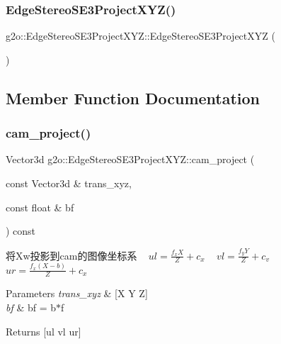 \subsubsection{\texorpdfstring{Edge\+Stereo\+S\+E3\+Project\+X\+Y\+Z()}{EdgeStereoSE3ProjectXYZ()}}
{\footnotesize\ttfamily g2o\+::\+Edge\+Stereo\+S\+E3\+Project\+X\+Y\+Z\+::\+Edge\+Stereo\+S\+E3\+Project\+X\+YZ (\begin{DoxyParamCaption}{ }\end{DoxyParamCaption})}



\subsection{Member Function Documentation}
\mbox{\label{classg2o_1_1_edge_stereo_s_e3_project_x_y_z_a5e1d2a6a247a6f9a95ccb7a59e3c543e}} 
\subsubsection{\texorpdfstring{cam\+\_\+project()}{cam\_project()}}
{\footnotesize\ttfamily Vector3d g2o\+::\+Edge\+Stereo\+S\+E3\+Project\+X\+Y\+Z\+::cam\+\_\+project (\begin{DoxyParamCaption}\item[{const Vector3d \&}]{trans\+\_\+xyz,  }\item[{const float \&}]{bf }\end{DoxyParamCaption}) const}

将\+Xw投影到cam的图像坐标系 ~\newline
 $ ul = \frac{f_x X}{Z} + c_x $ ~\newline
 $ vl = \frac{f_y Y}{Z} + c_v $ ~\newline
 $ ur = \frac{f_x (X-b)}{Z} + c_x $ ~\newline

\begin{DoxyParams}{Parameters}
{\em trans\+\_\+xyz} & \mbox{[}X Y Z\mbox{]} \\
\hline
{\em bf} & bf = b$\ast$f \\
\hline
\end{DoxyParams}
\begin{DoxyReturn}{Returns}
\mbox{[}ul vl ur\mbox{]} 
\end{DoxyReturn}
\mbox{\label{classg2o_1_1_edge_stereo_s_e3_project_x_y_z_ab60521439da10eabb13f23fe21fbe651}} 
